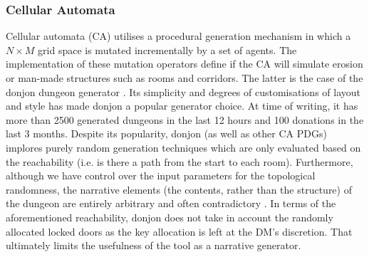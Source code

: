 \documentclass{UoYCSproject}
\begin{document}
\subsubsection{Cellular Automata}
Cellular automata (CA) utilises a procedural generation mechanism in which a $N \times M$ grid space is mutated incrementally by a set of agents. The implementation of these mutation operators define if the CA will simulate erosion \parencite{donjonCA} or man-made structures such as rooms and corridors. The latter is the case of the donjon dungeon generator \parencite{donjonPDG}. Its simplicity and degrees of customisations of layout and style has made donjon a popular generator choice. At time of writing, it has more than 2500 generated dungeons in the last 12 hours and 100 donations in the last 3 months. Despite its popularity, donjon (as well as other CA PDGs) implores purely random generation techniques which are only evaluated based on the reachability (i.e. is there a path from the start to each room). Furthermore, although we have control over the input parameters for the topological randomness, the narrative elements (the contents, rather than the structure) of the dungeon are entirely arbitrary and often contradictory \parencite{Thrall,Brown}. In terms of the aforementioned reachability, donjon does not take in account the randomly allocated locked doors as the key allocation is left at the DM's discretion. That ultimately limits the usefulness of the tool as a narrative generator. %
\end{document}
